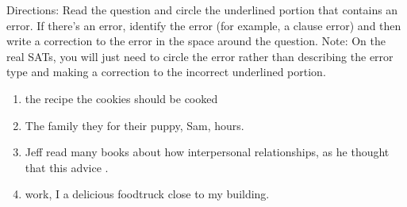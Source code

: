 \bigskip
Directions: Read the question and circle the underlined portion that contains an error. If there's an error, identify the error (for example, a clause error) and then write a correction to the error in the space around the question. Note: On the real SATs, you will just need to circle the error rather than describing the error type and making a correction to the incorrect underlined portion.

\begin{enumerate}
\item 

\begin{inparaenum}[A]
 the recipe   the cookies should be cooked  
\end{inparaenum}

\vfill\item 

\begin{inparaenum}[A]
The family   they  for their puppy, Sam,  hours. 
\end{inparaenum}

\vfill\item 

\begin{inparaenum}[A]
Jeff read many books about how  interpersonal relationships, as he thought that this advice  . 
\end{inparaenum}

\vfill\item

\begin{inparaenum}[A]
   work, I  a delicious foodtruck  close to my building. 
\end{inparaenum}


\end{enumerate}
